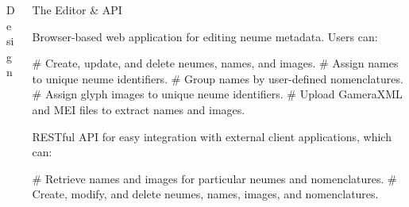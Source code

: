 \documentclass[final]{beamer}
\newlength{\onecolwid}
\newcommand{\blockSpace}{\vskip 0.75ex}
\begin{document}
\begin{frame}[fragile,t]
\begin{columns}
\begin{column}{\onecolwid}
\begin{block}{Design}

\end{block}



\end{column}
\begin{column}{\onecolwid}
\begin{block}{The Editor \& API}
\raggedright
Browser-based web application for editing neume metadata.  Users can:
\begin{easylist}[itemize]
# Create, update, and delete neumes, names, and images.
# Assign names to unique neume identifiers.
# Group names by user-defined nomenclatures.
# Assign glyph images to unique neume identifiers.
# Upload GameraXML and MEI files to extract names and images.
\end{easylist}

RESTful API for easy integration with external client applications, which can:
\begin{easylist}[itemize]
# Retrieve names and images for particular neumes and nomenclatures.
# Create, modify, and delete  neumes, names, images, and nomenclatures.
\end{easylist}
\end{block}
\end{column}
\end{columns}

\vspace{2cm}

\begin{columns}
\end{columns}
\end{frame}
\end{document}

